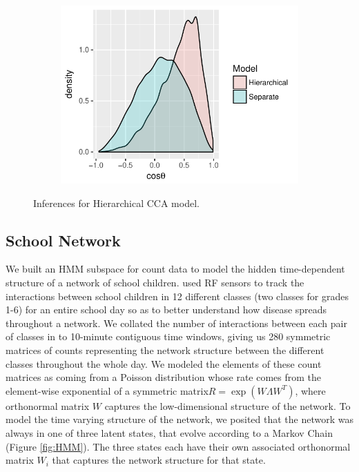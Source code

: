 \documentclass{article}
\begin{document}
\begin{figure}
    \begin{subfigure}[b]{0.3\textwidth}
        \includegraphics[width=\textwidth]{posteriorCosAngle.pdf}
        \caption{}
        \label{fig:posteriorCosAngle}
    \end{subfigure}
    \caption{Inferences for Hierarchical CCA model.}\label{fig:ccaResults}
\end{figure}

\subsection{School Network}
We built an HMM subspace for count data to model the hidden time-dependent structure of a network of school children. \citet{stehle2011high} used RF sensors to track the interactions between school children in 12 different classes (two classes for grades 1-6) for an entire school day so as to better understand how disease spreads throughout a network. We collated the number of interactions between each pair of classes in to 10-minute contiguous time windows, giving us 280 symmetric matrices of counts representing the network structure between the different classes throughout the whole day. We modeled the elements of these count matrices as coming from a Poisson distribution whose rate comes from the element-wise exponential of a symmetric matrix$R = \exp (W \Lambda W^T)$, where orthonormal matrix $W$ captures the low-dimensional structure of the network. To model the time varying structure of the network, we posited that the network was always in one of three latent states, that evolve according to a Markov Chain (Figure \ref{fig:HMM}). The three states each have their own associated orthonormal matrix $W_i$ that captures the network structure for that state. 
\end{document}
